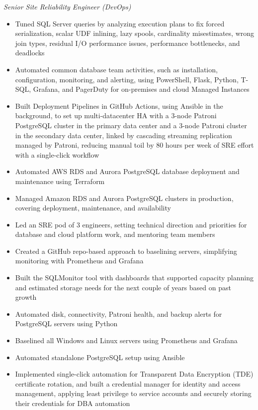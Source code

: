 \documentclass[10pt,a4paper]{article}
\begin{document}
\textit{Senior Site Reliability Engineer (DevOps)}\\[-5pt]
\begin{itemize}
  \item Tuned SQL Server queries by analyzing execution plans to fix forced serialization, scalar UDF inlining, lazy spools, cardinality misestimates, wrong join types, residual I/O performance issues, performance bottlenecks, and deadlocks
  \item Automated common database team activities, such as installation, configuration, monitoring, and alerting, using PowerShell, Flask, Python, T-SQL, Grafana, and PagerDuty for on-premises and cloud Managed Instances
  \item Built Deployment Pipelines in GitHub Actions, using Ansible in the background, to set up multi-datacenter HA with a 3-node Patroni PostgreSQL cluster in the primary data center and a 3-node Patroni cluster in the secondary data center, linked by cascading streaming replication managed by Patroni, reducing manual toil by 80 hours per week of SRE effort with a single-click workflow
  \item Automated AWS RDS and Aurora PostgreSQL database deployment and maintenance using Terraform
  \item Managed Amazon RDS and Aurora PostgreSQL clusters in production, covering deployment, maintenance, and availability
  \item Led an SRE pod of 3 engineers, setting technical direction and priorities for database and cloud platform work, and mentoring team members
  \item Created a GitHub repo-based approach to baselining servers, simplifying monitoring with Prometheus and Grafana
  \item Built the SQLMonitor tool with dashboards that supported capacity planning and estimated storage needs for the next couple of years based on past growth
  \item Automated disk, connectivity, Patroni health, and backup alerts for PostgreSQL servers using Python
  \item Baselined all Windows and Linux servers using Prometheus and Grafana
  \item Automated standalone PostgreSQL setup using Ansible
  \item Implemented single-click automation for Transparent Data Encryption (TDE) certificate rotation, and built a credential manager for identity and access management, applying least privilege to service accounts and securely storing their credentials for DBA automation

\end{itemize}
\end{document}
